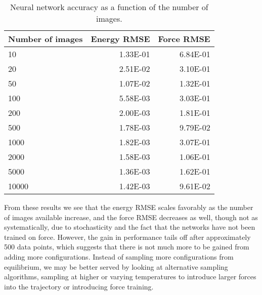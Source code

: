 \begin{table}[H]
\centering
\begin{tabular}{lrr}
\toprule
Number of images &  Energy RMSE &  Force RMSE \\
\midrule
             10 &     1.33E-01 &    6.84E-01 \\
             20 &     2.51E-02 &    3.10E-01 \\
             50 &     1.07E-02 &    1.32E-01 \\
            100 &     5.58E-03 &    3.03E-01 \\
            200 &     2.00E-03 &    1.81E-01 \\
            500 &     1.78E-03 &    9.79E-02 \\
           1000 &     1.82E-03 &    3.07E-01 \\
           2000 &     1.58E-03 &    1.06E-01 \\
           5000 &     1.36E-03 &    1.62E-01 \\
          10000 &     1.42E-03 &    9.61E-02 \\
\bottomrule
\end{tabular}
    \caption{Neural network accuracy as a function
        of the number of images.}
    \label{table:images}
\end{table}

From these results we see that the energy RMSE scales favorably as
the number of images available increase, and the force RMSE decreases
as well, though not as systematically, due to stochasticity and
the fact that the networks have not been trained on force.
However, the gain in performance tails off after approximately 500 data points,
which suggests that there is not much more to be gained from
adding more configurations.
Instead of sampling more configurations from equilibrium, we may
be better served by looking at alternative sampling algorithms,
sampling at higher or varying temperatures to introduce larger
forces into the trajectory or introducing force training.
